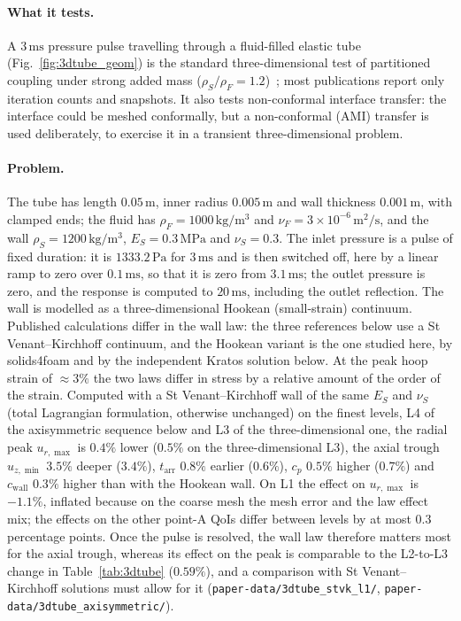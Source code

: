 \paragraph{What it tests.}
A $3\,\mathrm{ms}$ pressure pulse travelling through a fluid-filled elastic tube (Fig.~\ref{fig:3dtube_geom}) is the standard three-dimensional test of partitioned coupling under strong added mass ($\rho_S/\rho_F = 1.2$)~\citep{Formaggia2001, Gerbeau2003, Fernandez2005, kuttler2008fixed, Degroote2009}; most publications report only iteration counts and snapshots.
It also tests non-conformal interface transfer: the interface could be meshed conformally, but a non-conformal (AMI) transfer is used deliberately, to exercise it in a transient three-dimensional problem.

\paragraph{Problem.}
The tube has length $0.05\,\mathrm{m}$, inner radius $0.005\,\mathrm{m}$ and wall thickness $0.001\,\mathrm{m}$, with clamped ends; the fluid has $\rho_F = 1000\,\mathrm{kg/m^3}$ and $\nu_F = 3\times10^{-6}\,\mathrm{m^2/s}$, and the wall $\rho_S = 1200\,\mathrm{kg/m^3}$, $E_S = 0.3\,\mathrm{MPa}$ and $\nu_S = 0.3$.
The inlet pressure is a pulse of fixed duration: it is $1333.2\,\mathrm{Pa}$ for $3\,\mathrm{ms}$ and is then switched off, here by a linear ramp to zero over $0.1\,\mathrm{ms}$, so that it is zero from $3.1\,\mathrm{ms}$; the outlet pressure is zero, and the response is computed to $20\,\mathrm{ms}$, including the outlet reflection.
The wall is modelled as a three-dimensional Hookean (small-strain) continuum. Published calculations differ in the wall law: the three references below use a St Venant--Kirchhoff continuum, and the Hookean variant is the one studied here, by solids4foam and by the independent Kratos solution below.
At the peak hoop strain of $\approx3\%$ the two laws differ in stress by a relative amount of the order of the strain. Computed with a St Venant--Kirchhoff wall of the same $E_S$ and $\nu_S$ (total Lagrangian formulation, otherwise unchanged) on the finest levels, L4 of the axisymmetric sequence below and L3 of the three-dimensional one, the radial peak $u_{r,\max}$ is $0.4\%$ lower ($0.5\%$ on the three-dimensional L3), the axial trough $u_{z,\min}$ $3.5\%$ deeper ($3.4\%$), $t_\mathrm{arr}$ $0.8\%$ earlier ($0.6\%$), $c_p$ $0.5\%$ higher ($0.7\%$) and $c_\mathrm{wall}$ $0.3\%$ higher than with the Hookean wall. On L1 the effect on $u_{r,\max}$ is $-1.1\%$, inflated because on the coarse mesh the mesh error and the law effect mix; the effects on the other point-A QoIs differ between levels by at most $0.3$ percentage points. Once the pulse is resolved, the wall law therefore matters most for the axial trough, whereas its effect on the peak is comparable to the L2-to-L3 change in Table~\ref{tab:3dtube} ($0.59\%$), and a comparison with St Venant--Kirchhoff solutions must allow for it (\texttt{paper-data/3dtube\_stvk\_l1/}, \texttt{paper-data/3dtube\_axisymmetric/}).
